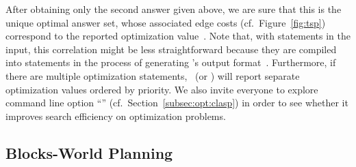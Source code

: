 %
After obtaining only the second answer given above,
we are sure that this is the unique optimal answer set,
whose associated edge costs (cf.\ Figure~\ref{fig:tsp}) correspond to
the reported optimization value~.
Note that, with  statements in the input, this correlation
might be less straightforward because they are compiled into 
statements in the process of generating \lparse's output format~\cite{lparseManual}.
Furthermore, if there are multiple optimization statements,
\clasp\ (or \clingo) will report separate optimization values ordered by priority.
We also invite everyone to explore command line option ``''
(cf.\ Section~\ref{subsec:opt:clasp})
in order to see whether it improves search efficiency on optimization problems.


\subsection{Blocks-World Planning}\label{subsec:ex:block}

